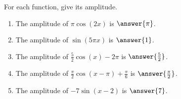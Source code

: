 \documentclass{ximera}
\author{Kenneth Berglund}
\begin{document}
\begin{exercise}
For each function, give its amplitude. 

\begin{enumerate}
\item The amplitude of $\pi\cos(2x)$ is $\answer{\pi}$.

\item The amplitude of $\sin(5\pi x)$ is $\answer{1}$.

\item The amplitude of $\frac{5}{2}\cos(x) - 2\pi$ is $\answer{\frac{5}{2}}$.

\item The amplitude of $\frac{\pi}{2}\cos(x - \pi) + \frac{\pi}{6}$ is $\answer{\frac{\pi}{2}}$.

\item The amplitude of $-7\sin(x - 2)$ is $\answer{7}$.
\end{enumerate}


\end{exercise}
\end{document}
